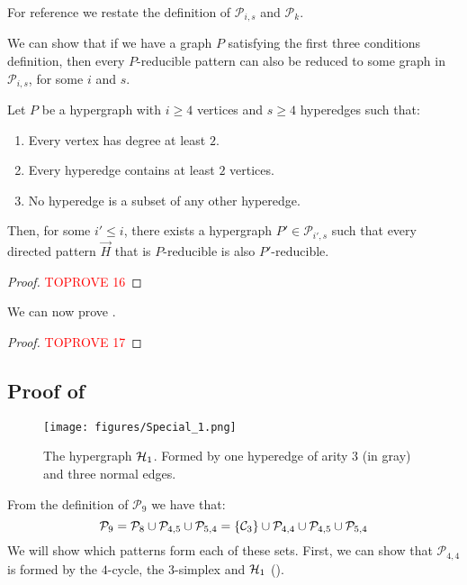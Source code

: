 \documentclass[a4paper,UKenglish,cleveref, autoref, numberwithinsect, thm-restate]{lipics-v2021}
\newcommand{\reducible}[1]{${#1}$-reducible}
\newcommand{\cycle}[1]{\cC_{#1}}
\newcommand{\hyperone}{\cH_1}
\newcommand{\cC}{{\cal C}}
\newcommand{\cH}{{\cal H}}
\newcommand{\cP}{\mathcal{P}}
\begin{document}
	For reference we restate the definition of $\mathcal{P}_{i,s}$ and $\mathcal{P}_k$.
	
	\calp*
	
	We can show that if we have a graph $P$ satisfying the first three conditions definition, then every \reducible{P} pattern can also be reduced to some graph in $\mathcal{P}_{i,s}$, for some $i$ and $s$.
	
	\begin{lemma} \label{lem:simplify}
		Let $P$ be a hypergraph with $i\geq4$ vertices and $s \geq 4$ hyperedges such that:
		\begin{enumerate}
			\item Every vertex has degree at least $2$.
			\item Every hyperedge contains at least $2$ vertices.
			\item No hyperedge is a subset of any other hyperedge.
		\end{enumerate}
		Then, for some $i' \leq i$, there exists a hypergraph $P' \in \mathcal{P}_{i',s}$ such that every directed pattern $\vec{H}$ that is \reducible{P} is also \reducible{P'}.
	\end{lemma}
	\begin{proof}\textcolor{red}{TOPROVE 16}\end{proof}
	
	We can now prove .
	
	\pkcomputable*
	\begin{proof}\textcolor{red}{TOPROVE 17}\end{proof}
	
	\subsection{Proof of }
	
	\begin{figure}
		\centering
		\texttt{[image: figures/Special\_1.png]}\caption{The hypergraph $\hyperone$. Formed by one hyperedge of arity $3$ (in gray) and three normal edges.}
		\label{fig:hyperone}
	\end{figure}
	
	From the definition of $\cP_9$ we have that:
	\[
		\cP_9 = \cP_8 \cup \cP_{4,5}  \cup \cP_{5,4} = \{\cycle{3}\} \cup \cP_{4,4} \cup \cP_{4,5}  \cup \cP_{5,4}
	\]
	We will show which patterns form each of these sets. First, we can show that $\cP_{4,4}$ is formed by the $4$-cycle, the $3$-simplex and $\hyperone$ ().
	
\end{document}
